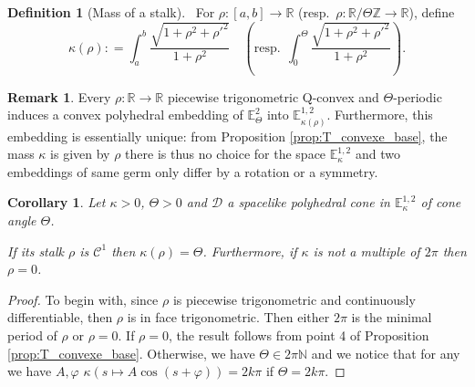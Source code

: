 \documentclass[a4paper,12pt]{article}
\def\ZZ{\mathbb{Z}}
\def\NN{\mathbb N}
\def\RR{\mathbb{R}}
\newcommand{\mass}[1]{{\mathbb E}^{1,2}_{#1}}
\def\Cone{\mathcal D}
\newtheorem{cor}[lem]{Corollary}
\theoremstyle{definition}
\newtheorem{defi}[lem]{Definition}	%
\newtheorem*{rem}{Remark}			 %
\begin{document}
					

					\begin{defi}[Mass of a stalk]\label{def:mass_stalk} \
					For $\rho: [a,b]\rightarrow \RR$ (resp.\ $\rho: \RR/\Theta \ZZ\rightarrow \RR$), define 	$$ \kappa(\rho): = \int_a^b \frac{\sqrt{1+\rho^2+\rho'^2}}{1+\rho^2}\quad \left(\mathrm{resp.} ~~\int_0^\Theta \frac{\sqrt{1+\rho^2+\rho'^2}}{1+\rho^2} \right).$$
					\end{defi}

					\begin{rem}\label{rem:piecewise_trigonometric_q_convex_periodic}
					 Every $\rho:\RR\rightarrow \RR$ piecewise trigonometric Q-convex and $\Theta$-periodic induces
					a convex polyhedral embedding of $\mathbb E^2_\Theta$ into $\mass{\kappa(\rho)}$.
					Furthermore, this embedding is essentially unique:
					from Proposition \ref{prop:T_convexe_base}, the mass $\kappa$ is given by $\rho$ there is thus no choice for the space $\mass{\kappa}$ and two embeddings of same germ only differ by a rotation or a symmetry.
					\end{rem}
 
					\begin{cor}\label{cor:kappa_coplanaire}
					Let $\kappa>0$, $\Theta>0$ and $\Cone$ a spacelike polyhedral cone in
					$\mass{\kappa}$ of cone angle $\Theta$.

					If its stalk $\rho$ is $\mathscr C^1$ then $\kappa(\rho)=\Theta$. 
					Furthermore, if $\kappa$ is not a multiple of $2\pi$ then $\rho=0$.
					\end{cor}

					\begin{proof} 
					To begin with, since $\rho$ is piecewise trigonometric and continuously differentiable, then $\rho$ is in face trigonometric. 
					Then either  $2\pi$ is the minimal period of $\rho$ or $\rho=0$.
					If $\rho=0$, the result follows from point 4 of Proposition \ref{prop:T_convexe_base}. Otherwise, we have $\Theta \in 2\pi \NN$ and we notice that for any we have $A,\varphi$  $\kappa(s\mapsto A\cos(s+\varphi))=2k\pi$ if $\Theta=2k \pi$.  
					\end{proof}
\end{document}
